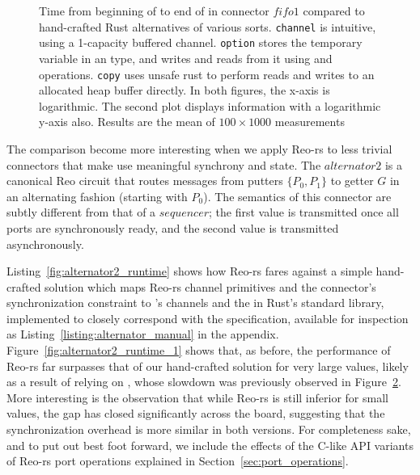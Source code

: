 \begin{figure}
{\begin{subfigure}[b]{0.63\textwidth}
			\caption{}
			\label{fig:exper_rtt_1}
		\end{subfigure}%
	}
	\caption[Performance of fifo1 connector vs.\ hand-crafted Rust code.]{Time from beginning of  to end of  in connector $fifo1$ compared to hand-crafted Rust alternatives of various sorts. \texttt{channel} is intuitive, using a  1-capacity buffered channel. \texttt{option} stores the temporary variable in an  type, and writes and reads from it using  and  operations. \texttt{copy} uses unsafe rust to perform reads and writes to an allocated heap buffer directly. In both figures, the x-axis is logarithmic. The second plot displays information with a logarithmic y-axis also. Results are the mean of $100\times{}1000$ measurements}
	\label{fig:exper_rtt}
\end{figure}

The comparison become more interesting when we apply Reo-rs to less trivial connectors that make use meaningful synchrony and state. The $alternator2$ is a canonical Reo circuit that routes messages from putters $\{P_0, P_1\}$ to getter $G$ in an alternating fashion (starting with $P_0$). The semantics of this connector are subtly different from that of a $sequencer$; the first value is transmitted once all ports are synchronously ready, and the second value is transmitted asynchronously.

Listing~\ref{fig:alternator2_runtime} shows how Reo-rs fares against a simple hand-crafted solution which maps Reo-rs channel primitives and the connector's synchronization constraint to 's channels and the  in Rust's standard library, implemented to closely correspond with the specification, available for inspection as Listing~\ref{listing:alternator_manual} in the appendix. Figure~\ref{fig:alternator2_runtime_1} shows that, as before, the performance of Reo-rs far surpasses that of our hand-crafted solution for very large values, likely as a result of relying on , whose slowdown was previously observed in Figure~\ref{fig:exper_rtt}. More interesting is the observation that while Reo-rs is still inferior for small values, the gap has closed significantly across the board, suggesting that the synchronization overhead is more similar in both versions. For completeness sake, and to put out best foot forward, we include the effects of the C-like  API variants of Reo-rs port operations explained in Section~\ref{sec:port_operations}.  

